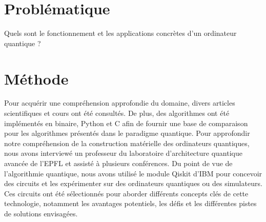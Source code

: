 \documentclass[final,5p,times,twocolumn,authoryear]{elsarticle}
\begin{document}
\begin{frontmatter}


\end{frontmatter}




\section*{Problématique}

Quels sont le fonctionnement et les applications concrètes d'un ordinateur quantique ?

\section*{Méthode}

Pour acquérir une compréhension approfondie du domaine, divers articles scientifiques et cours ont été consultés. De plus, des algorithmes ont été implémentés en binaire, Python et C afin de fournir une base de comparaison pour les algorithmes présentés dans le paradigme quantique. Pour approfondir notre compréhension de la construction matérielle des ordinateurs quantiques, nous avons interviewé un professeur du laboratoire d'architecture quantique avancée de l'EPFL et assisté à plusieurs conférences. Du point de vue de l'algorithmie quantique, nous avons utilisé le module Qiskit d'IBM pour concevoir des circuits et les expérimenter sur des ordinateurs quantiques ou des simulateurs. Ces circuits ont été sélectionnés pour aborder différents concepts clés de cette technologie, notamment les avantages potentiels, les défis et les différentes pistes de solutions envisagées.
\end{document}

